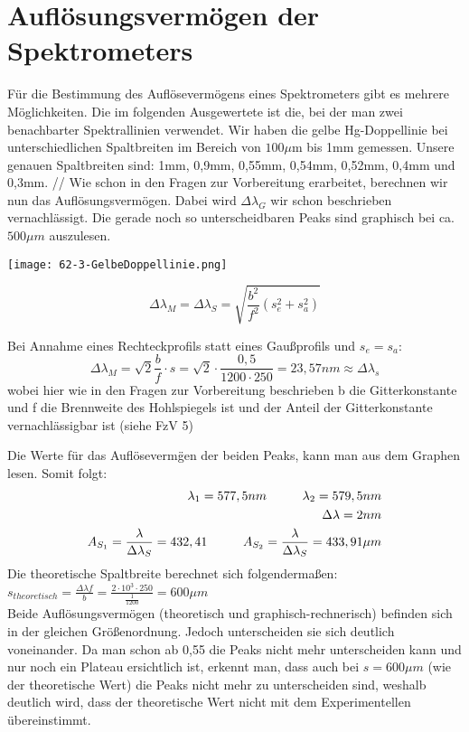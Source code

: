 \section{Auflösungsvermögen der Spektrometers}
F\"ur die Bestimmung des Aufl\"oseverm\"ogens eines Spektrometers gibt es mehrere M\"oglichkeiten. Die im folgenden Ausgewertete ist die, bei der man zwei benachbarter 
Spektrallinien verwendet. Wir haben die gelbe Hg-Doppellinie bei unterschiedlichen Spaltbreiten im Bereich von $100\mu$m bis 1mm gemessen. 
Unsere genauen Spaltbreiten sind: 1mm, 0,9mm, 0,55mm, 0,54mm, 0,52mm, 0,4mm und 0,3mm. //
Wie schon in den Fragen zur Vorbereitung erarbeitet, berechnen wir nun das Aufl\"osungsverm\"ogen. Dabei wird $\Delta\lambda_G$ wir schon beschrieben vernachl\"assigt. 
Die gerade noch so unterscheidbaren Peaks sind graphisch bei ca. $500\mu m$ auszulesen.   \\
\begin{center}
    \texttt{[image: 62-3-GelbeDoppellinie.png]}
\end{center}
\begin{equation}
\Delta\lambda_M=\Delta\lambda_S=\sqrt{\frac{b^2}{f^2}(s_e^2+s_a^2)}
\end{equation}


Bei Annahme eines Rechteckprofils statt eines Gaußprofils und $s_e=s_a$:
\begin{equation}
\Delta\lambda_M=\sqrt{2}\frac{b}{f}\cdot s = \sqrt{2}\cdot \frac{0,5}{1200\cdot 250} =23,57nm \approx \Delta\lambda_s
\end{equation}
wobei hier wie in den Fragen zur Vorbereitung beschrieben b die Gitterkonstante und f die Brennweite des Hohlspiegels ist und der Anteil der Gitterkonstante 
vernachl\"assigbar ist (siehe FzV 5)

Die Werte f\"ur das Aufl\"oseverm\"gen der beiden Peaks, kann man aus dem Graphen lesen. Somit folgt:\\
\begin{align}
\lambda_1=577,5nm \tab \lambda_2=579,5nm\\
\Delta\lambda=2nm\\
A_{S_1}=\frac{\lambda}{\Delta\lambda_S}=432,41 \tab A_{S_2}=\frac{\lambda}{\Delta\lambda_S}=433,91\mu m
\end{align}
Die theoretische Spaltbreite berechnet sich folgenderma\ss{}en:\\
$s_{theoretisch} = \frac{\Delta\lambda f}{b}=\frac{2 \cdot 10^3 \cdot 250}{\frac{1}{1200}}= 600\mu m$\\
Beide Aufl\"osungsverm\"ogen (theoretisch und graphisch-rechnerisch) befinden sich in der gleichen Gr\"o\ss{}enordnung. Jedoch unterscheiden sie sich deutlich 
voneinander. Da man schon ab 0,55 die Peaks nicht mehr unterscheiden kann und nur noch ein Plateau ersichtlich ist, erkennt man, dass auch bei $s=600\mu m$ (wie der 
theoretische Wert) die Peaks nicht mehr zu unterscheiden sind, weshalb deutlich wird, dass der theoretische Wert nicht mit dem Experimentellen \"ubereinstimmt.
